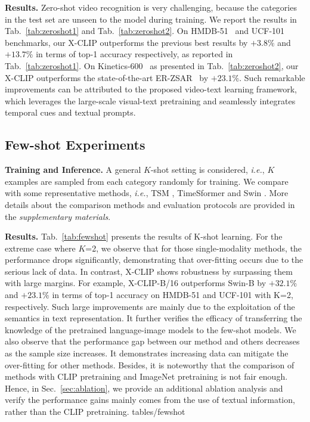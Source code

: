 \documentclass[runningheads]{llncs}
\begin{document}
\textbf{Results.} Zero-shot video recognition is very challenging, because the categories in the test set are unseen to the model during training. We report the results in Tab.~\ref{tab:zeroshot1} and Tab.~\ref{tab:zeroshot2}. On HMDB-51~\cite{kuehne2011hmdb} and UCF-101~\cite{soomro2012ucf101} benchmarks, our X-CLIP outperforms the previous best results by $+3.8\%$ and $+13.7\%$ in terms of top-1 accuracy respectively, as reported in Tab.~\ref{tab:zeroshot1}. On Kinetics-600~\cite{k600} as presented in Tab.~\ref{tab:zeroshot2}, our X-CLIP outperforms the state-of-the-art ER-ZSAR~\cite{chen2021elaborative} by $+23.1\%$. Such remarkable improvements can be attributed to the proposed video-text learning framework, which leverages the large-scale visual-text pretraining and seamlessly integrates temporal cues and textual prompts. %


\subsection{Few-shot Experiments} \label{sec:few-shot}

\textbf{Training and Inference.} A general $K$-shot setting is considered, \emph{i.e.}, $K$ examples are sampled from each category randomly for training. We compare with some representative methods, \emph{i.e.}, TSM \cite{lin2019tsm}, TimeSformer \cite{timesformer2021} and Swin \cite{liu2021video}. More details about the comparison methods and evaluation protocols are provided in the \emph{supplementary materials}.

\textbf{Results.} Tab.~\ref{tab:fewshot} presents the results of K-shot learning. For the extreme case where $K$=2, we observe that for those single-modality methods, the performance drops significantly, demonstrating that over-fitting occurs due to the serious lack of data. In contrast, X-CLIP shows robustness by surpassing them with large margins. For example, X-CLIP-B/16 outperforms Swin-B by $+32.1\%$ and $+23.1\%$ in terms of top-1 accuracy on HMDB-51 and UCF-101 with K=2, respectively. Such large improvements are mainly due to the exploitation of the semantics in text representation. It further verifies the efficacy of transferring the knowledge of the pretrained language-image models to the few-shot models. We also observe that the performance gap between our method and others decreases as the sample size increases. It demonstrates increasing data can mitigate the over-fitting for other methods. Besides, it is noteworthy that the comparison of methods with CLIP pretraining and ImageNet pretraining is not fair enough. Hence, in Sec.~\ref{sec:ablation}, we provide an additional ablation analysis and verify the performance gains mainly comes from the use of textual information, rather than the CLIP pretraining. 
{tables/fewshot}
\end{document}
